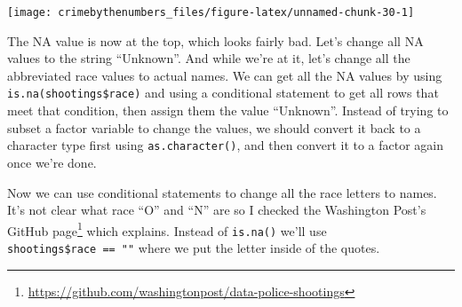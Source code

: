 \documentclass[
]{krantz}
\makeatletter
\newenvironment{Shaded}{\begin{snugshade}}{\end{snugshade}}
\newcommand{\FunctionTok}[1]{\textcolor[rgb]{0,0,0}{#1}}
\newcommand{\NormalTok}[1]{#1}
\newcommand{\OtherTok}[1]{\textcolor[rgb]{0.37,0.37,0.37}{#1}}
\newcommand{\SpecialCharTok}[1]{\textcolor[rgb]{0,0,0}{#1}}
\newcommand{\StringTok}[1]{\textcolor[rgb]{0.5,0.5,0.5}{#1}}
\renewcommand{\href}[2]{#2\footnote{\url{#1}}}
\newenvironment{kframe}{%
\medskip{}
\setlength{\fboxsep}{.8em}
 \def\at@end@of@kframe{}%
 \ifinner\ifhmode%
  \def\at@end@of@kframe{\end{minipage}}%
  \begin{minipage}{\columnwidth}%
 \fi\fi%
 \def\FrameCommand##1{\hskip\@totalleftmargin \hskip-\fboxsep
 \colorbox{shadecolor}{##1}\hskip-\fboxsep
     \hskip-\linewidth \hskip-\@totalleftmargin \hskip\columnwidth}%
 \MakeFramed {\advance\hsize-\width
   \@totalleftmargin\z@ \linewidth\hsize
   \@setminipage}}%
 {\par\unskip\endMakeFramed%
 \at@end@of@kframe}
\renewenvironment{Shaded}{\begin{kframe}}{\end{kframe}}
\makeatother
\begin{document}
\begin{center}\texttt{[image: crimebythenumbers\_files/figure-latex/unnamed-chunk-30-1]} \end{center}

The NA value is now at the top, which looks fairly bad. Let's change all NA values to the string ``Unknown''. And while we're at it, let's change all the abbreviated race values to actual names. We can get all the NA values by using \texttt{is.na(shootings\$race)} and using a conditional statement to get all rows that meet that condition, then assign them the value ``Unknown''. Instead of trying to subset a factor variable to change the values, we should convert it back to a character type first using \texttt{as.character()}, and then convert it to a factor again once we're done.

\begin{Shaded}
\end{Shaded}

Now we can use conditional statements to change all the race letters to names. It's not clear what race ``O'' and ``N'' are so I checked the \href{https://github.com/washingtonpost/data-police-shootings}{Washington Post's GitHub page} which explains. Instead of \texttt{is.na()} we'll use \texttt{shootings\$race\ ==\ ""} where we put the letter inside of the quotes.

\begin{Shaded}
\end{Shaded}
\end{document}
